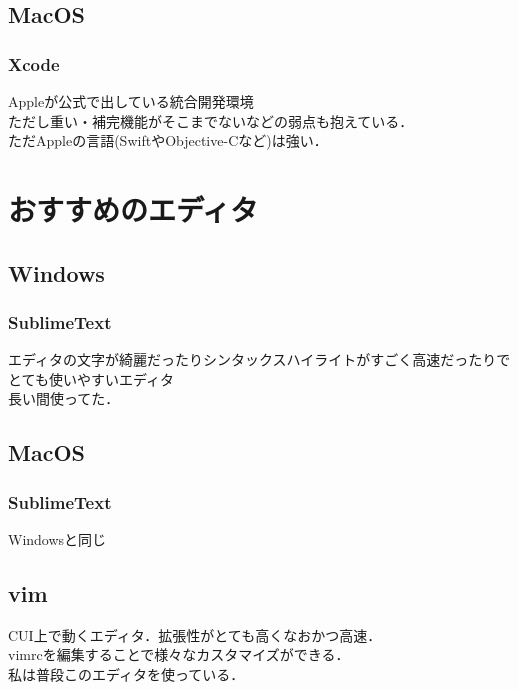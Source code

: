 \subsection{MacOS}
\subsubsection{Xcode}
Appleが公式で出している統合開発環境\\
ただし重い・補完機能がそこまでないなどの弱点も抱えている．\\
ただAppleの言語(SwiftやObjective-Cなど)は強い．\\
\section{おすすめのエディタ}
\subsection{Windows}
\subsubsection{SublimeText}
エディタの文字が綺麗だったりシンタックスハイライトがすごく高速だったりでとても使いやすいエディタ\\
長い間使ってた．
\subsection{MacOS}
\subsubsection{SublimeText}
Windowsと同じ
\subsection{vim}
CUI上で動くエディタ．拡張性がとても高くなおかつ高速．\\
vimrcを編集することで様々なカスタマイズができる．\\
私は普段このエディタを使っている．\\
